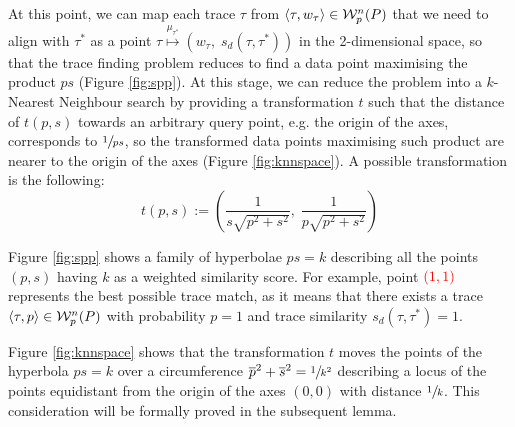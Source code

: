 At this point, we can map each trace $\tau$ from $\braket{\tau,w_\tau}\in\mathcal{W}_p^n(P)$ that we need to align with $\tau^*$ as a point $\tau\overset{\mu_{\tau^*}}{\mapsto}(w_\tau,\; s_d(\tau,\tau^*))$ in the 2-dimensional space, so that the trace finding problem reduces to find a data point maximising the product $ps$ (Figure \ref{fig:spp}). At this stage, we can reduce the problem into a $k$-Nearest Neighbour search by providing a transformation $t$ such that the distance of $t(p,s)$ towards an arbitrary query point, e.g. the origin of the axes, corresponds to $\sfrac{1}{ps}$, so the transformed data points maximising such product are nearer to the origin of the axes (Figure \ref{fig:knnspace}). A possible transformation is the following:
\[t(p,s):=\left(\frac{1}{s\sqrt{p^2+s^2}},\; \frac{1}{p\sqrt{p^2+s^2}}\right)\]

\begin{example}
Figure \ref{fig:spp} shows a family of hyperbolae $ps=k$ describing all the points $(p,s)$ having $k$ as a weighted similarity score. For example,  point $\color{red}(1,1)$ represents the best possible trace match, as it means that there exists a trace $\braket{\tau,p}\in\mathcal{W}_p^n(P)$ with probability $p=1$ and trace similarity $s_d(\tau,\tau^*)=1$.

Figure \ref{fig:knnspace} shows that the transformation $t$ moves the points of the hyperbola $ps=k$ over a circumference $\overline{p}^2+\overline{s}^2=\sfrac{1}{k^2}$ describing a locus of the points equidistant from the origin of the axes $(0,0)$ with distance $\sfrac{1}{k}$. %
This consideration will be formally proved in the subsequent lemma.
\end{example}


